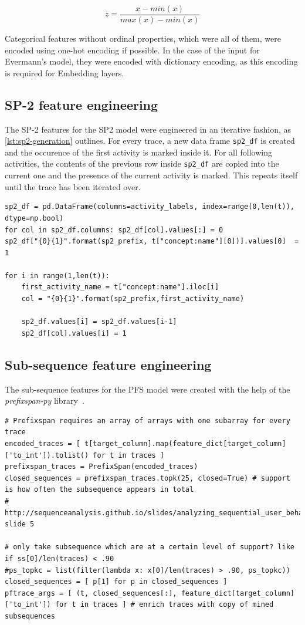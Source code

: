 $$z = \frac{x-min(x)}{max(x)-min(x)}$$

Categorical features without ordinal properties, which were all of them, were encoded using one-hot encoding if possible. In the case of the input for Evermann's model, they were encoded with dictionary encoding, as this encoding is required for Embedding layers.

\subsection*{SP-2 feature engineering}
The SP-2 features for the SP2 model were engineered in an iterative fashion, as \autoref{lst:sp2-generation} outlines. For every trace, a new data frame \texttt{sp2\_df} is created and the occurence of the first activity is marked inside it. For all following activities, the contents of the previous row inside \texttt{sp2\_df} are copied into the current one and the presence of the current activity is marked. This repeats itself until the trace has been iterated over.

\begin{lstlisting}[caption={SP-2 feature generation algorithm for a single trace},label={lst:sp2-generation}]
sp2_df = pd.DataFrame(columns=activity_labels, index=range(0,len(t)), dtype=np.bool)
for col in sp2_df.columns: sp2_df[col].values[:] = 0
sp2_df["{0}{1}".format(sp2_prefix, t["concept:name"][0])].values[0]  = 1

for i in range(1,len(t)):
    first_activity_name = t["concept:name"].iloc[i]
    col = "{0}{1}".format(sp2_prefix,first_activity_name)
    
    sp2_df.values[i] = sp2_df.values[i-1]
    sp2_df[col].values[i] = 1
\end{lstlisting}

\subsection*{Sub-sequence feature engineering}
The sub-sequence features for the PFS model were created with the help of the \textit{prefixspan-py} library~\cite{web:prefixspan-py}.

\begin{lstlisting}
# Prefixspan requires an array of arrays with one subarray for every trace
encoded_traces = [ t[target_column].map(feature_dict[target_column]['to_int']).tolist() for t in traces ]
prefixspan_traces = PrefixSpan(encoded_traces)
closed_sequences = prefixspan_traces.topk(25, closed=True) # support is how often the subsequence appears in total
# http://sequenceanalysis.github.io/slides/analyzing_sequential_user_behavior_part2.pdf, slide 5

# only take subsequence which are at a certain level of support? like if ss[0]/len(traces) < .90
#ps_topkc = list(filter(lambda x: x[0]/len(traces) > .90, ps_topkc))
closed_sequences = [ p[1] for p in closed_sequences ]
pftrace_args = [ (t, closed_sequences[:], feature_dict[target_column]['to_int']) for t in traces ] # enrich traces with copy of mined subsequences
\end{lstlisting}

